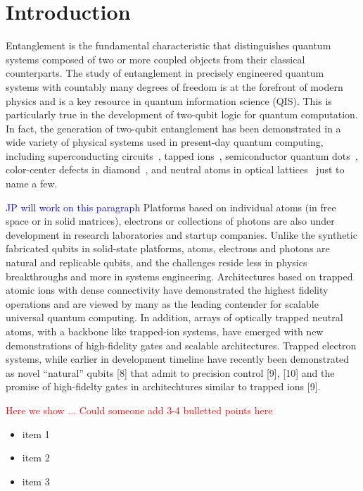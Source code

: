 \documentclass[twocolumn,superscriptaddress,unsortedaddress,
 amsmath,amssymb,
 aps,
]{revtex4-2}
\begin{document}
\section{Introduction} %
Entanglement is the fundamental characteristic that distinguishes
quantum systems composed of two or more coupled objects from their classical counterparts. The study of entanglement in precisely engineered quantum systems with countably many degrees of freedom is at the forefront of modern physics and is a key resource in quantum information science (QIS). This is particularly true in the development of two-qubit logic for quantum computation. In fact, the generation of two-qubit entanglement has been demonstrated in a wide variety of physical systems used in present-day quantum computing, including superconducting circuits~\cite{Steffen1423}, tapped ions~\cite{}, semiconductor quantum dots~\cite{Li809}, color-center defects in diamond~\cite{}, and neutral atoms in optical lattices~\cite{Saffman1010} just to name a few.

\textcolor{blue}{JP will work on this paragraph}
Platforms based on individual atoms (in free space or in solid matrices), electrons or collections of photons are also under development in research laboratories and startup companies. Unlike the synthetic fabricated qubits in solid-state platforms, atoms, electrons and photons are natural and replicable qubits, and the challenges reside less in physics breakthroughs and more in systems engineering.  Architectures based on trapped atomic ions with dense connectivity have demonstrated the highest fidelity operations and are viewed by many as the leading contender for scalable universal quantum computing.  In addition, arrays of optically trapped neutral atoms, with a backbone like trapped-ion systems, have emerged with new demonstrations of high-fidelity gates and scalable architectures.  Trapped electron systems, while earlier in development timeline have recently been demonstrated as novel “natural” qubits [8] that admit to precision control [9], [10] and the promise of high-fidelty gates in architechtures similar to trapped ions [9].

\textcolor{red}{{Here we show ... Could someone add 3-4 bulletted points here}}
\begin{itemize}
    \item item 1
    \item item 2
    \item item 3
\end{itemize}
\end{document}
